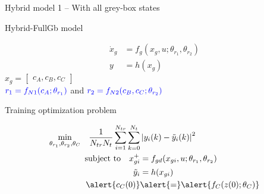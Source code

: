 \documentclass[xcolor=dvipsnames, 8pt]{beamer} %
\begin{document}
\begin{frame}{Hybrid model 1 -- With all grey-box states}

\begin{block}{Hybrid-FullGb model}

	\begin{align*}
		\dot{x}_{g} &= f_g(x_g, u;\theta_{r_1}, \theta_{r_2}) \\ 
		y &= h(x_g)
	\end{align*}
	$x_g = \begin{bmatrix} c_A, c_B, c_C\end{bmatrix}$ \\
	$\textcolor{blue}{r_1 = f_{N1}(c_A;\theta_{r_1})}$ and 
	$\textcolor{blue}{r_2 = f_{N2}(c_B, c_C;\theta_{r_2})}$
\end{block}

\pause
\begin{block}{Training optimization problem}
	
	\begin{align*}
		\underset{\theta_{r_1}, 
				  \theta_{r_2}, \theta_{C}}{\textnormal{min}} \quad 
		\dfrac{1}{N_{tr} 
			N_t} \sum_{i=1}^{N_{tr}}
		\sum_{k=0}^{N_t} & \norm{y_i(k) - \tilde{y}_i(k)}^2 \\ 
		\textnormal{subject to} \quad x_{gi}^+ & = f_{gd}(x_{gi}, 
		u;\theta_{r_1}, 
		\theta_{r_2}) \\
		\tilde{y}_i &= h(x_{gi}) \\ 
		\alert{c_C(0)} & \alert{=} \alert{f_C(z(0); \theta_C)}\\ 
	\end{align*}
\end{block}

\end{frame}
\end{document}

